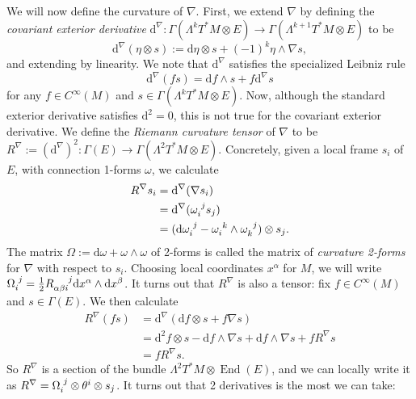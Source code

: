 \documentclass{book}
\renewcommand{\d}{\mathrm{d}}
\DeclareMathOperator{\End}{\mathrm{End}}
\theoremstyle{definition}
\numberwithin{equation}{section}
\begin{document}
We will now define the curvature of $\nabla$. First, we extend $\nabla$ by defining the \textit{covariant exterior derivative} $\d^\nabla \colon \Gamma(\Lambda^k T^*M \otimes E) \to \Gamma(\Lambda^{k+1} T^*M \otimes E)$ to be 
\begin{equation}
    \d^\nabla(\eta \otimes s) := \d\eta \otimes s + (-1)^k \eta \wedge \nabla s,
\end{equation}
and extending by linearity. We note that $\d^\nabla$ satisfies the specialized Leibniz rule 
\begin{equation}
    \d^\nabla(f s) = \d f \wedge s + f \d^\nabla s
\end{equation}
for any $f \in C^\infty(M)$ and $s \in \Gamma(\Lambda^k T^*M \otimes E)$. Now, although the standard exterior derivative satisfies $\d^2 = 0$, this is not true for the covariant exterior derivative. We define the \textit{Riemann curvature tensor} of $\nabla$ to be $R^\nabla := (\d^\nabla)^2 \colon \Gamma(E) \to \Gamma(\Lambda^2 T^*M \otimes E)$. Concretely, given a local frame $s_i$ of $E$, with connection 1-forms $\omega$, we calculate 
\begin{equation} \begin{aligned}
    R^\nabla s_i &= \d^\nabla(\nabla s_i) \\ 
                 &= \d^\nabla(\tensor{\omega}{_i^j} s_j) \\
                 &= ( \d\tensor{\omega}{_i^j} - \tensor{\omega}{_i^k} \wedge \tensor{\omega}{_k^j}) \otimes s_j.
\end{aligned} \end{equation}
The matrix $\Omega := \d\omega + \omega \wedge \omega$ of 2-forms is called the matrix of \textit{curvature 2-forms} for $\nabla$ with respect to $s_i$. Choosing local coordinates $x^\alpha$ for $M$, we will write $\tensor{\Omega}{_i^j} = \frac{1}{2} \tensor{R}{_\alpha_\beta_i^j} \d x^\alpha \wedge \d x^\beta$. It turns out that $R^\nabla$ is also a tensor: fix $f \in C^\infty(M)$ and $s \in \Gamma(E)$. We then calculate
\begin{equation} \begin{aligned}
    R^\nabla(fs) &= \d^\nabla( \d f \otimes s + f \nabla s ) \\ 
                 &= \d^2 f \otimes s - \d f \wedge \nabla s + \d f \wedge \nabla s + f R^\nabla s \\
                 &= f R^\nabla s.
\end{aligned} \end{equation}
So $R^\nabla$ is a section of the bundle $\Lambda^2 T^*M \otimes \End(E)$, and we can locally write it as $R^\nabla = \tensor{\Omega}{_i^j} \otimes \theta^i \otimes s_j$. It turns out that 2 derivatives is the most we can take:
\end{document}
